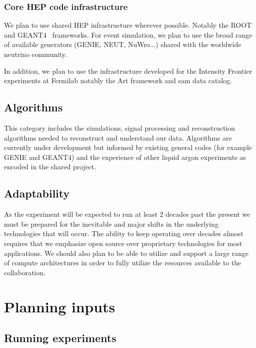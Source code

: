 \subsubsection{Core HEP code infrastructure}
We plan to use shared HEP infrastructure wherever possible.  Notably the ROOT\cite{root} and GEANT4~\cite{geant4,Allison:2006ve} frameworks.   For event simulation, we plan to use the broad range of available generators (GENIE, NEUT, NuWro...) shared with the worldwide neutrino community.

In addition, we plan to use the infrastructure developed for the Intensity Frontier experiments at Fermilab notably the Art framework and sam data catalog. 


\subsection{Algorithms}
This category includes the simulations, signal processing and reconstruction algorithms needed to reconstruct and understand our data. Algorithms are currently under development but informed by existing general codes (for example GENIE and GEANT4) and the experience of other liquid argon experiments as encoded in the shared   project.



\subsection{Adaptability}
As the experiment will be expected to run at least 2 decades past the present we must be prepared for the inevitable and major shifts in the underlying technologies that will occur. The ability to keep operating over decades almost requires that we emphasize open source over proprietary technologies for most applications.  We should also plan to be able to utilize and support a large range of compute architectures in order to fully utilize the resources available to the collaboration.








\section{Planning inputs}


\subsection{Running experiments}\label{sw:IF-input}


